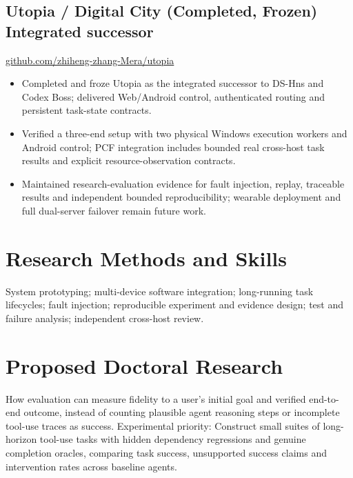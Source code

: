 \documentclass[10pt,a4paper]{article}
\begin{document}
\subsection*{Utopia / Digital City (Completed, Frozen) \hfill \small Integrated successor}
\href{https://github.com/zhiheng-zhang-Mera/utopia}{github.com/zhiheng-zhang-Mera/utopia}
\begin{itemize}
\item Completed and froze Utopia as the integrated successor to DS-Hns and Codex Boss; delivered Web/Android control, authenticated routing and persistent task-state contracts.
\item Verified a three-end setup with two physical Windows execution workers and Android control; PCF integration includes bounded real cross-host task results and explicit resource-observation contracts.
\item Maintained research-evaluation evidence for fault injection, replay, traceable results and independent bounded reproducibility; wearable deployment and full dual-server failover remain future work.
\end{itemize}

\section{Research Methods and Skills}
System prototyping; multi-device software integration; long-running task lifecycles; fault injection; reproducible experiment and evidence design; test and failure analysis; independent cross-host review.

\section{Proposed Doctoral Research}
How evaluation can measure fidelity to a user's initial goal and verified end-to-end outcome, instead of counting plausible agent reasoning steps or incomplete tool-use traces as success. Experimental priority: Construct small suites of long-horizon tool-use tasks with hidden dependency regressions and genuine completion oracles, comparing task success, unsupported success claims and intervention rates across baseline agents.

\par\smallskip{}
\end{document}

